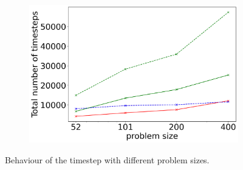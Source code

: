 \begin{figure}[H]
\begin{subfigure}[b]{0.32\textwidth}
		\centering
		\includegraphics[width=1\textwidth]{images/TANDEM_NumberTimeSteps_differentSizes.png}
	\end{subfigure}
	\caption{Behaviour of the timestep with different problem sizes.}
	\label{fig:scalabilty_timeStepSizes}
\end{figure}

